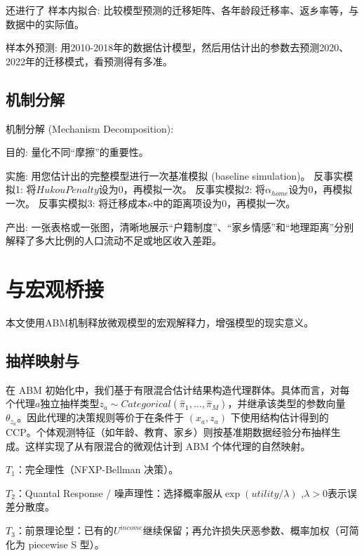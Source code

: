 \documentclass[
  a4paper,
  zihao=-4,
  fontset=mac,
  AutoFakeBold,
  AutoFakeSlant,
  oneside]{ctexbook}
\begin{document}
还进行了
样本内拟合: 比较模型预测的迁移矩阵、各年龄段迁移率、返乡率等，与数据中的实际值。

样本外预测: 用2010-2018年的数据估计模型，然后用估计出的参数去预测2020、2022年的迁移模式，看预测得有多准。


\section{机制分解} %
\label{sec:机制分解}

机制分解 (Mechanism Decomposition):

目的: 量化不同“摩擦”的重要性。

实施:
用您估计出的完整模型进行一次基准模拟 (baseline simulation)。
反事实模拟1: 将$HukouPenalty$设为$0$，再模拟一次。
反事实模拟2: 将$\alpha_{home}$设为$0$，再模拟一次。
反事实模拟3: 将迁移成本$\kappa$中的距离项设为$0$，再模拟一次。

产出: 一张表格或一张图，清晰地展示“户籍制度”、“家乡情感”和“地理距离”分别解释了多大比例的人口流动不足或地区收入差距。


\chapter{与宏观桥接} %
\label{sec:与宏观桥接}

本文使用ABM机制释放微观模型的宏观解释力，增强模型的现实意义。


\section{抽样映射与} %
\label{sub:抽样映射与}


在 ABM 初始化中，我们基于有限混合估计结果构造代理群体。具体而言，对每个代理$a$独立抽样类型$z_a\sim Categorical(\hat \pi_1,\dots,\hat \pi_M)$，并继承该类型的参数向量 $\theta_{z_a}$。因此代理的决策规则等价于在条件于 $(x_a,z_a)$ 下使用结构估计得到的 CCP。个体观测特征（如年龄、教育、家乡）则按基准期数据经验分布抽样生成。这样实现了从有限混合的微观估计到 ABM 个体代理的自然映射。




$𝑇_1$：完全理性（NFXP-Bellman 决策）。

$𝑇_2$：Quantal Response / 噪声理性：选择概率服从$\exp(utility/\lambda)$ ,$\lambda>0$表示误差分散度。

$𝑇_3$：前景理论型：已有的$U^{income}$继续保留；再允许损失厌恶参数、概率加权（可简化为 piecewise S 型）。
\end{document}
